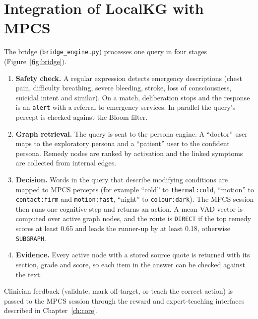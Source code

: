 \documentclass[12pt,a4paper,oneside]{report}
\newcommand{\code}[1]{\texttt{\small #1}}
\begin{document}
\chapter{Integration of LocalKG with MPCS}\label{ch:bridge}
The bridge (\code{bridge\_engine.py}) processes one query in four stages (Figure~\ref{fig:bridge}).

\begin{enumerate}
  \item \textbf{Safety check.} A regular expression detects emergency descriptions (chest pain, difficulty breathing, severe bleeding, stroke, loss of consciousness, suicidal intent and similar). On a match, deliberation stops and the response is an \code{alert} with a referral to emergency services. In parallel the query's percept is checked against the Bloom filter.
  \item \textbf{Graph retrieval.} The query is sent to the persona engine. A ``doctor'' user maps to the exploratory persona and a ``patient'' user to the confident persona. Remedy nodes are ranked by activation and the linked symptoms are collected from internal edges.
  \item \textbf{Decision.} Words in the query that describe modifying conditions are mapped to MPCS percepts (for example ``cold'' to \code{thermal:cold}, ``motion'' to \code{contact:firm} and \code{motion:fast}, ``night'' to \code{colour:dark}). The MPCS session then runs one cognitive step and returns an action. A mean VAD vector is computed over active graph nodes, and the route is \code{DIRECT} if the top remedy scores at least 0.65 and leads the runner-up by at least 0.18, otherwise \code{SUBGRAPH}.
  \item \textbf{Evidence.} Every active node with a stored source quote is returned with its section, grade and score, so each item in the answer can be checked against the text.
\end{enumerate}
Clinician feedback (validate, mark off-target, or teach the correct action) is passed to the MPCS session through the reward and expert-teaching interfaces described in Chapter~\ref{ch:core}.
\end{document}
